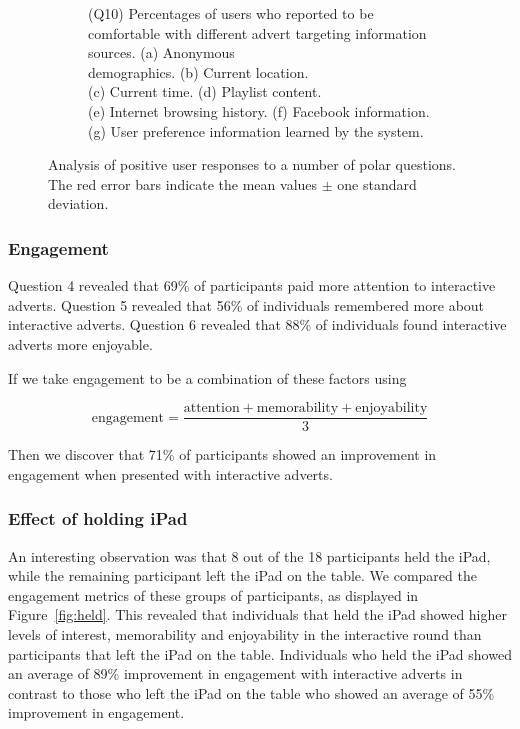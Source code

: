 \begin{figure}[!ht]
\begin{subfigure}[t]{0.49\textwidth}
			\caption{(Q10) Percentages of users who reported to be comfortable with different advert targeting information sources. (a) Anonymous \\demographics. (b) Current location. \\(c) Current time. (d) Playlist content. \\(e) Internet browsing history. (f) Facebook information. (g) User preference information learned by the system.}
		\end{subfigure}
		\caption{Analysis of positive user responses to a number of polar questions. The red error bars indicate the mean values $\pm$ one standard deviation.}
		\label{fig:qualitative_results}
	\end{figure}



	\subsubsection{Engagement}

	Question 4 revealed that 69\% of participants paid more attention to interactive adverts. Question 5 revealed that 56\% of individuals remembered more about interactive adverts. Question 6 revealed that 88\% of individuals found interactive adverts more enjoyable. 

	If we take engagement to be a combination of these factors using

	$$
	\text{engagement} = \frac{\text{attention} + \text{memorability} + \text{enjoyability}}{3}
	$$

	Then we discover that 71\% of participants showed an improvement in engagement when presented with interactive adverts.



	\subsubsection{Effect of holding iPad}

	An interesting observation was that 8 out of the 18 participants held the iPad, while the remaining participant left the iPad on the table. We compared the engagement metrics of these groups of participants, as displayed in Figure~\ref{fig:held}. This revealed that individuals that held the iPad showed higher levels of interest, memorability and enjoyability in the interactive round than participants that left the iPad on the table. Individuals who held the iPad showed an average of 89\% improvement in engagement with interactive adverts in contrast to those who left the iPad on the table who showed an average of 55\% improvement in engagement.

